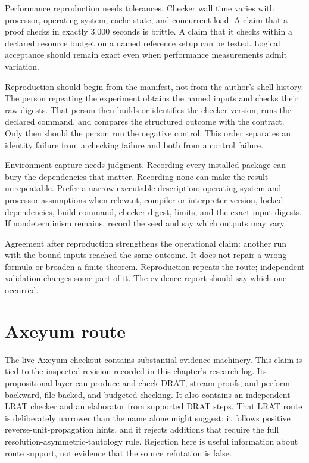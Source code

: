 Performance reproduction needs tolerances. Checker wall time varies with
processor, operating system, cache state, and concurrent load. A claim that a
proof checks in exactly 3.000 seconds is brittle. A claim that it checks within
a declared resource budget on a named reference setup can be tested. Logical
acceptance should remain exact even when performance measurements admit
variation.

Reproduction should begin from the manifest, not from the author's shell
history. The person repeating the experiment obtains the named inputs and
checks their raw digests. That person then
builds or identifies the checker version, runs the declared command, and
compares the structured outcome with the contract. Only then should the person
run the negative control. This order separates an identity failure
from a checking failure and both from a control failure.

Environment capture needs judgment. Recording every installed package can
bury the dependencies that matter. Recording none can make the result
unrepeatable. Prefer a narrow executable description: operating-system and
processor assumptions when relevant, compiler or interpreter version, locked
dependencies, build command, checker digest, limits, and the exact input
digests. If nondeterminism remains, record the seed and say which outputs may
vary.

Agreement after reproduction strengthens the operational claim: another run
with the bound inputs reached the same outcome. It does not repair a wrong
formula or broaden a finite theorem. Reproduction repeats the route;
independent validation changes some part of it. The evidence report should say
which one occurred.

\section{Axeyum route}

The live Axeyum checkout contains substantial evidence machinery. This claim
is tied to the inspected revision recorded in this chapter's research log. Its
propositional layer can produce and check DRAT, stream proofs, and perform
backward, file-backed, and budgeted checking. It also contains an independent
LRAT checker and an elaborator from supported DRAT steps. That LRAT route is
deliberately narrower than the name alone might suggest: it follows positive
reverse-unit-propagation hints, and it rejects additions that require the full
resolution-asymmetric-tautology rule. Rejection here is useful information
about route support, not evidence that the source refutation is false.

